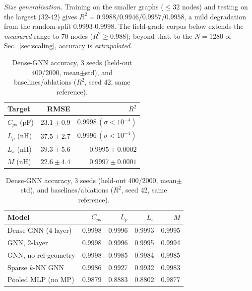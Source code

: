\documentclass[letterpaper,twocolumn,9pt]{extarticle}
\begin{document}
\emph{Size generalization.} Training on the smaller graphs ($\le32$ nodes) and
testing on the largest ($32$-$42$) gives $R^2 = 0.9988/0.9946/0.9957/0.9958$, a
mild degradation from the random-split $0.9993$-$0.9998$. The field-grade corpus
below extends the \emph{measured} range to 70 nodes ($R^2\ge0.988$); beyond that,
to the $N\!=\!1280$ of Sec.~\ref{sec:scaling}, accuracy is \emph{extrapolated}.

\begin{table}[t]
\caption{Dense-GNN accuracy, 3 seeds (held-out 400/2000, mean$\pm$std), and
baselines/ablations ($R^2$, seed 42, same reference).}
\label{tab:acc}
\centering
\small
\begin{tabular}{lrr}
\toprule
Target & RMSE & $R^2$\\
\midrule
$C_{ps}$ (pF)   & $23.1\pm0.9$  & $0.9998\,(\sigma\!<\!10^{-4})$\\
$L_{p}$ (nH)    & $37.5\pm2.7$  & $0.9996\,(\sigma\!<\!10^{-4})$\\
$L_{s}$ (nH)    & $39.3\pm5.6$  & $0.9995\pm0.0002$\\
$M$ (nH)    & $22.6\pm4.4$  & $0.9997\pm0.0001$\\
\bottomrule
\end{tabular}

\vspace{4pt}
\label{tab:abl}
\begin{tabular}{lrrrr}
\toprule
Model & $C_{ps}$ & $L_{p}$ & $L_{s}$ & $M$\\
\midrule
Dense GNN (4-layer)      & 0.9998 & 0.9996 & 0.9993 & 0.9995\\
GNN, 2-layer             & 0.9998 & 0.9996 & 0.9995 & 0.9994\\
GNN, no rel-geometry     & 0.9998 & 0.9985 & 0.9984 & 0.9985\\
Sparse $k$-NN GNN        & 0.9986 & 0.9927 & 0.9932 & 0.9983\\
Pooled MLP (no MP)       & 0.9879 & 0.8883 & 0.8802 & 0.9877\\
\bottomrule
\end{tabular}
\end{table}
\end{document}
